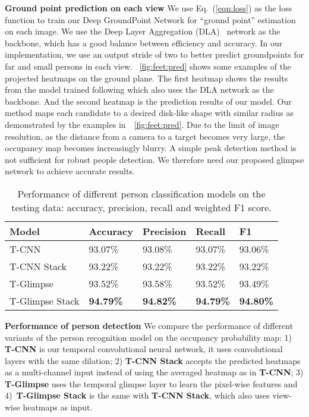 \documentclass{article}
\begin{document}
\textbf{Ground point prediction on each view}
We use Eq.~(\ref{eqn:loss}) as the loss function to train our Deep GroundPoint Network for ``ground point'' estimation on each image. We use the Deep Layer Aggregation (DLA)~\cite{yu2018deep} network as
the backbone, which
has a good balance between efficiency and accuracy.
In our implementation, we use an output stride of two to better predict groundpoints for far and small persons in each view.
\figurename{~\ref{fig:feet:pred}} shows some examples of the projected heatmaps on the ground plane. The first heatmap shows the
results from the model trained following \cite{zhou2019objects} which also uses the DLA network
as the
backbone. And the second heatmap is the prediction results of our model.
Our method maps each candidate to a desired disk-like shape with similar radius
as demonstrated by the examples in~\figurename{~\ref{fig:feet:pred}}.
Due to the limit of image resolution, as the distance from a camera to a target becomes
very large, the occupancy map becomes increasingly blurry. A simple peak detection method is not sufficient
for robust people detection.
We therefore need our proposed glimpse network
to achieve accurate results.

\begin{table}[!htbp]
	\begin{center}
		\caption{Performance of different person classification models on the testing data: accuracy, precision, recall and weighted F1 score.}
		\label{tab:people:det}
		\begin{tabular}{l|l|l|l|l}
			\hline
			Model &	Accuracy	&	Precision	&	Recall	&	F1	\\  \hline
			T-CNN	&	93.07\%	&	93.08\%	&	93.07\%	&	93.06\%	\\
			T-CNN Stack	&	93.22\%	&	93.22\%	&	93.22\%	&	93.22\%	\\
			T-Glimpse	&	93.52\%	&	93.58\%	&	93.52\%	&	93.49\%	\\
			T-Glimpse Stack	&	\textbf{94.79\%}	&	\textbf{94.82\%}	&	\textbf{94.79\%}	&	\textbf{94.80\%}	\\
			\hline
		\end{tabular}
	\end{center}
\end{table}

\textbf{Performance of person detection}
We compare the performance of different variants of the person recognition model on the occupancy probability map: 1) \textbf{T-CNN} is our temporal
convolutional neural network, it uses convolutional layers with the same dilation; 2) \textbf{T-CNN Stack} accepts the predicted heatmaps  as a multi-channel input instead of using the
averaged heatmap  as in \textbf{T-CNN}; 3) \textbf{T-Glimpse} uses the temporal glimpse layer to learn the pixel-wise features and 4)~\textbf{T-Glimpse Stack} is the same with \textbf{T-CNN Stack}, which also
uses view-wise heatmaps as input.
\end{document}
